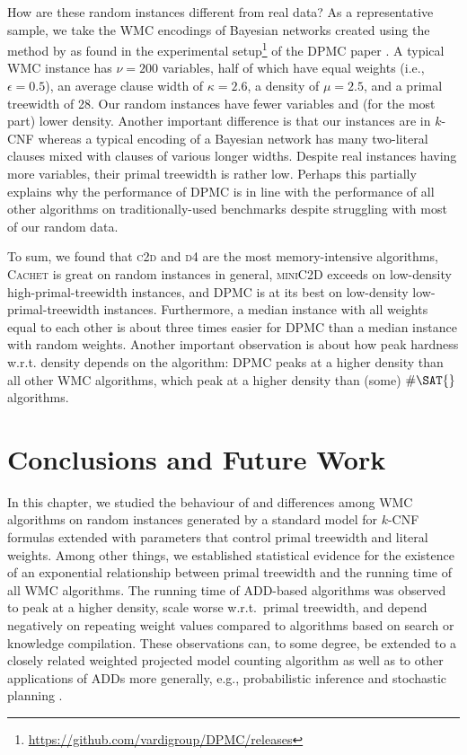 How are these random instances different from real data? As a representative sample, we take the \textsf{WMC} encodings of Bayesian networks created using the method by \citet{DBLP:conf/aaai/SangBK05} as found in the experimental setup\footnote{\url{https://github.com/vardigroup/DPMC/releases}} of the \textsc{DPMC} paper \citep{DBLP:conf/cp/DudekPV20}. A typical \textsf{WMC} instance has $\nu = 200$ variables, half of which have equal weights (i.e., $\epsilon = 0.5$), an average clause width of $\kappa = 2.6$, a density of $\mu = 2.5$, and a primal treewidth of 28. Our random instances have fewer variables and (for the most part) lower density. Another important difference is that our instances are in $k$-CNF whereas a typical encoding of a Bayesian network has many two-literal clauses mixed with clauses of various longer widths. Despite real instances having more variables, their primal treewidth is rather low. Perhaps this partially explains why the performance of \textsc{DPMC} is in line with the performance of all other algorithms on traditionally-used benchmarks \citep{DBLP:conf/cp/DudekPV20} despite struggling with most of our random data.

To sum, we found that \textsc{c2d} and
\textsc{d4} are the most memory-intensive
algorithms, \textsc{Cachet} is great on random
instances in general, \textsc{miniC2D} exceeds
on low-density high-primal-treewidth instances, and
\textsc{DPMC} is at its best on low-density
low-primal-treewidth instances. Furthermore, a median instance with all weights
equal to each other is about three times easier for \textsc{DPMC} than a median
instance with random weights. Another important observation is about how peak
hardness w.r.t. density depends on the algorithm: \textsc{DPMC} peaks at a
higher density than all other \textsc{WMC} algorithms, which peak at a higher
density than (some) $\#\SAT{}$ algorithms.

\section{Conclusions and Future Work}

In this chapter, we studied the behaviour of and differences among \textsf{WMC}
algorithms on random instances generated by a standard model for $k$-CNF
formulas extended with parameters that control primal treewidth and literal
weights. Among other things, we established statistical evidence for the
existence of an exponential relationship between primal treewidth and the
running time of all \textsf{WMC} algorithms. The running time of ADD-based
algorithms was observed to peak at a higher density, scale worse w.r.t.\ primal
treewidth, and depend negatively on repeating weight values compared to
algorithms based on search or knowledge compilation. These observations can, to
some degree, be extended to a closely related weighted projected model counting
algorithm \citep{DBLP:conf/sat/DudekPV21} as well as to other applications of
ADDs more generally, e.g., probabilistic inference
\citep{DBLP:conf/ijcai/ChaviraD07,DBLP:conf/uai/GogateD11} and stochastic
planning \citep{DBLP:conf/uai/HoeySHB99}.

